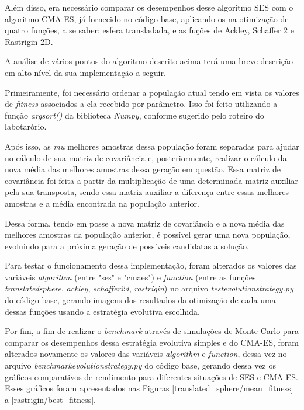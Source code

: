 \documentclass[conference]{IEEEtran}
\begin{document}
Além disso, era necessário comparar os desempenhos desse algoritmo SES com o algoritmo CMA-ES, já fornecido no código base, aplicando-os na otimização de quatro funções, a se saber: esfera transladada, e as fuções de Ackley, Schaffer 2 e Rastrigin 2D.

A análise de vários pontos do algoritmo descrito acima terá uma breve descrição em alto nível da sua implementação a seguir. 

Primeiramente, foi necessário ordenar a população atual tendo em vista os valores de \textit{fitness} associados a ela recebido por parâmetro. Isso foi feito utilizando a função \textit{argsort()} da biblioteca \textit{Numpy}, conforme sugerido pelo roteiro do labotarório.

Após isso, as \textit{mu} melhores amostras dessa população foram separadas para ajudar no cálculo de sua matriz de covariância e, posteriormente, realizar o cálculo da nova média das melhores amostras dessa geração em questão. Essa matriz de covariância foi feita a partir da multiplicação de uma determinada matriz auxiliar pela sua transposta, sendo essa matriz auxiliar a diferença entre essas melhores amostras e a média encontrada na população anterior.

Dessa forma, tendo em posse a nova matriz de covariância e a nova média das melhores amostras da população anterior, é possível gerar uma nova população, evoluindo para a próxima geração de possíveis candidatas a solução.

Para testar o funcionamento dessa implementação, foram alterados os valores das variáveis \textit{algorithm} (entre "ses" e "cmaes") e \textit{function} (entre as funções \textit{translated\underline{\space}sphere}, \textit{ackley}, \textit{schaffer2d}, \textit{rastrigin}) no arquivo \textit{test\underline{\space}evolution\underline{\space}strategy.py} do código base, gerando imagens dos resultados da otimização de cada uma dessas funções usando a estratégia evolutiva escolhida.

Por fim, a fim de realizar o \textit{benchmark} através de simulações de Monte Carlo para comparar os desempenhos dessa estratégia evolutiva simples e do CMA-ES, foram alterados novamente os valores das variáveis \textit{algorithm} e \textit{function}, dessa vez no arquivo \textit{benchmark\underline{\space}evolution\underline{\space}strategy.py} do código base, gerando dessa vez os gráficos comparativos de rendimento para diferentes situações de SES e CMA-ES. Esses gráficos foram apresentados nas Figuras \ref{translated_sphere/mean_fitness} a \ref{rastrigin/best_fitness}.
\end{document}
